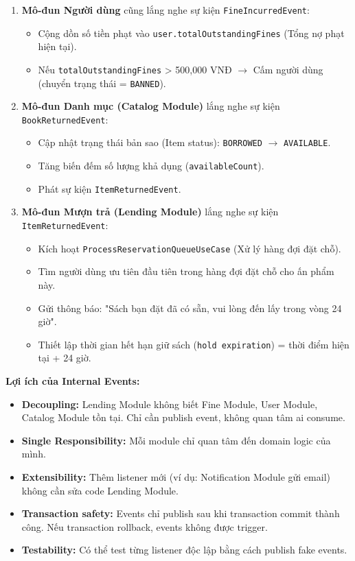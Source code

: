 \begin{enumerate}
    \item \textbf{Mô-đun Người dùng} cũng lắng nghe sự kiện \texttt{FineIncurredEvent}:
    \begin{itemize}
        \item Cộng dồn số tiền phạt vào \texttt{user.totalOutstandingFines} (Tổng nợ phạt hiện tại).
        \item Nếu \texttt{totalOutstandingFines} > 500,000 VNĐ $\rightarrow$ Cấm người dùng (chuyển trạng thái = \texttt{BANNED}).
    \end{itemize}
    
    \item \textbf{Mô-đun Danh mục (Catalog Module)} lắng nghe sự kiện \texttt{BookReturnedEvent}:
    \begin{itemize}
        \item Cập nhật trạng thái bản sao (Item status): \texttt{BORROWED} $\rightarrow$ \texttt{AVAILABLE}.
        \item Tăng biến đếm số lượng khả dụng (\texttt{availableCount}).
        \item Phát sự kiện \texttt{ItemReturnedEvent}.
    \end{itemize}
    
    \item \textbf{Mô-đun Mượn trả (Lending Module)} lắng nghe sự kiện \texttt{ItemReturnedEvent}:
    \begin{itemize}
        \item Kích hoạt \texttt{ProcessReservationQueueUseCase} (Xử lý hàng đợi đặt chỗ).
        \item Tìm người dùng ưu tiên đầu tiên trong hàng đợi đặt chỗ cho ấn phẩm này.
        \item Gửi thông báo: "Sách bạn đặt đã có sẵn, vui lòng đến lấy trong vòng 24 giờ".
        \item Thiết lập thời gian hết hạn giữ sách (\texttt{hold expiration}) = thời điểm hiện tại + 24 giờ.
    \end{itemize}
\end{enumerate}

\textbf{Lợi ích của Internal Events:}
\begin{itemize}
    \item \textbf{Decoupling:} Lending Module không biết Fine Module, User Module, Catalog Module tồn tại. Chỉ cần publish event, không quan tâm ai consume.
    \item \textbf{Single Responsibility:} Mỗi module chỉ quan tâm đến domain logic của mình.
    \item \textbf{Extensibility:} Thêm listener mới (ví dụ: Notification Module gửi email) không cần sửa code Lending Module.
    \item \textbf{Transaction safety:} Events chỉ publish sau khi transaction commit thành công. Nếu transaction rollback, events không được trigger.
    \item \textbf{Testability:} Có thể test từng listener độc lập bằng cách publish fake events.
\end{itemize}

